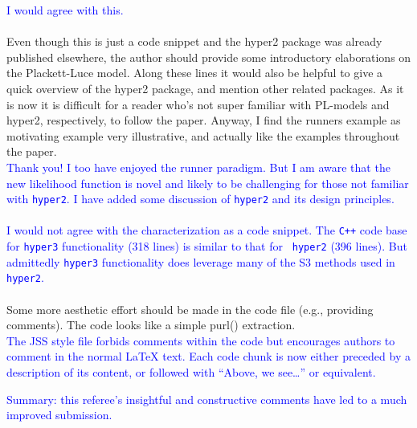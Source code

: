 \documentclass[12pt]{article}
\begin{document}
\textcolor{blue}{I would agree with this.}\\ \\


Even though this is just a code snippet and the hyper2 package was
already published elsewhere, the author should provide some
introductory elaborations on the Plackett-Luce model. Along these
lines it would also be helpful to give a quick overview of the hyper2
package, and mention other related packages. As it is now it is
difficult for a reader who's not super familiar with PL-models and
hyper2, respectively, to follow the paper. Anyway, I find the runners
example as motivating example very illustrative, and actually like the
examples throughout the paper.\\ \textcolor{blue}{Thank you!  I too
  have enjoyed the runner paradigm.  But I am aware that the new
  likelihood function is novel and likely to be challenging for those
  not familiar with {\tt hyper2}.  I have added some discussion of
  {\tt hyper2} and its design principles.\\ \\I would not agree with
  the characterization as a code snippet.  The {\tt C++} code base for
  {\tt hyper3} functionality (318 lines) is similar to that for {\tt
    hyper2} (396 lines).  But admittedly {\tt hyper3} functionality
  does leverage many of the S3 methods used in {\tt hyper2}.}\\ \\

Some more aesthetic effort should be made in the code file (e.g.,
providing comments). The code looks like a simple purl()
extraction.\\ \textcolor{blue}{The JSS style file forbids comments
  within the code but encourages authors to comment in the normal
  LaTeX text.  Each code chunk is now either preceded by a description
  of its content, or followed with ``Above, we see\ldots'' or
  equivalent.}

\textcolor{blue}{Summary: this referee's insightful and
  constructive comments have led to a much improved submission.}
\end{document}
